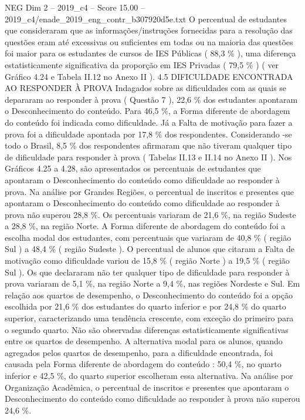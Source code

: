 \begin{textsample}{NEG Dim 2 – 2019\_c4 – Score 15.00 – 2019\_c4/enade\_2019\_eng\_contr\_b307920d5e.txt}
O percentual de estudantes que consideraram que as informações/instruções fornecidas para a resolução das questões eram até excessivas ou suficientes em todas ou na maioria das questões foi maior para os estudantes de cursos de IES Públicas ( 88,3 \% ), uma diferença estatisticamente significativa da proporção em IES Privadas ( 79,5 \% ) ( ver Gráfico 4.24 e Tabela II.12 no Anexo II ). 4.5 DIFICULDADE ENCONTRADA AO RESPONDER À PROVA Indagados sobre as dificuldades com as quais se depararam ao responder à prova ( Questão 7 ), 22,6 \% dos estudantes apontaram o Desconhecimento do conteúdo.
Para 46,5 \%, a Forma diferente de abordagem do conteúdo foi indicada como dificuldade.
Já a Falta de motivação para fazer a prova foi a dificuldade apontada por 17,8 \% dos respondentes.
Considerando -se todo o Brasil, 8,5 \% dos respondentes afirmaram que não tiveram qualquer tipo de dificuldade para responder à prova ( Tabelas II.13 e II.14 no Anexo II ).
Nos Gráficos 4.25 a 4.28, são apresentados os percentuais de estudantes que apontaram o Desconhecimento do conteúdo como dificuldade ao responder à prova.
Na análise por Grandes Regiões, o percentual de inscritos e presentes que apontaram o Desconhecimento do conteúdo como dificuldade ao responder à prova não superou 28,8 \%.
Os percentuais variaram de 21,6 \%, na região Sudeste a 28,8 \%, na região Norte.
A Forma diferente de abordagem do conteúdo foi a escolha modal dos estudantes, com percentuais que variaram de 40,8 \% ( região Sul ) a 48,4 \% ( região Sudeste ).
O percentual de alunos que citaram a Falta de motivação como dificuldade variou de 15,8 \% ( região Norte ) a 19,5 \% ( região Sul ).
Os que declararam não ter qualquer tipo de dificuldade para responder à prova variaram de 5,1 \%, na região Norte a 9,4 \%, nas regiões Nordeste e Sul.
Em relação aos quartos de desempenho, o Desconhecimento do conteúdo foi a opção escolhida por 21,6 \% dos estudantes do quarto inferior e por 24,8 \% do quarto superior, caracterizando uma tendência crescente, com exceção do primeiro para o segundo quarto.
Não são observadas diferenças estatisticamente significativas entre os quartos de desempenho.
A alternativa modal para os alunos, quando agregados pelos quartos de desempenho, para a dificuldade encontrada, foi causada pela Forma diferente de abordagem do conteúdo : 50,4 \%, no quarto inferior e 42,5 \%, do quarto superior escolheram essa alternativa.
Na análise por Organização Acadêmica, o percentual de inscritos e presentes que apontaram o Desconhecimento do conteúdo como dificuldade ao responder à prova não superou 24,6 \%.

\end{textsample}
